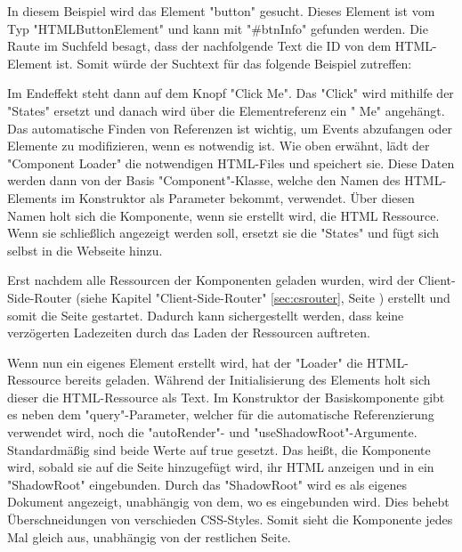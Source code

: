 In diesem Beispiel wird das Element "{\ttfamily button}" gesucht. Dieses Element ist vom Typ "{\ttfamily HTMLButtonElement}" und kann mit "{\ttfamily \#btnInfo}" gefunden werden. Die Raute im Suchfeld besagt, dass der nachfolgende Text die ID von dem HTML-Element ist. Somit würde der Suchtext für das folgende Beispiel zutreffen:


Im Endeffekt steht dann auf dem Knopf "Click Me". Das "Click" wird mithilfe der
"States" ersetzt und danach wird über die Elementreferenz ein " Me" angehängt. Das automatische Finden von Referenzen ist wichtig, um Events abzufangen oder Elemente zu modifizieren, wenn es notwendig ist.
Wie oben erwähnt, lädt der "Component Loader" die notwendigen HTML-Files und speichert sie. Diese Daten werden dann von der Basis "Component"-Klasse, welche den Namen des HTML-Elements im Konstruktor als Parameter bekommt, verwendet. Über diesen Namen holt sich die Komponente, wenn sie erstellt wird, die HTML Ressource. Wenn sie schließlich angezeigt werden soll, ersetzt sie die "States" und fügt sich selbst in die Webseite hinzu.


Erst nachdem alle Ressourcen der Komponenten geladen wurden, wird der Client-Side-Router (siehe Kapitel "Client-Side-Router" \ref{sec:csrouter}, Seite \pageref{sec:csrouter}) erstellt und somit die Seite gestartet. Dadurch kann sichergestellt werden, dass keine verzögerten Ladezeiten durch das Laden der Ressourcen auftreten.

\begin{minipage}{\textwidth}
    
    Wenn nun ein eigenes Element erstellt wird, hat der "Loader" die HTML-Ressource bereits geladen. Während der Initialisierung des Elements holt sich dieser die HTML-Ressource als Text. Im Konstruktor der Basiskomponente gibt es neben dem "query"-Parameter, welcher für die automatische Referenzierung verwendet wird, noch die "autoRender"- und "useShadowRoot"-Argumente. Standardmäßig sind beide Werte auf {\ttfamily true} gesetzt. Das heißt, die Komponente wird, sobald sie auf die Seite hinzugefügt wird, ihr HTML anzeigen und in ein "ShadowRoot" eingebunden. Durch das "ShadowRoot" wird es als eigenes Dokument angezeigt, unabhängig von dem, wo es eingebunden wird. Dies behebt Überschneidungen von verschieden CSS-Styles. Somit sieht die Komponente jedes Mal gleich aus, unabhängig von der restlichen Seite.
\end{minipage}

